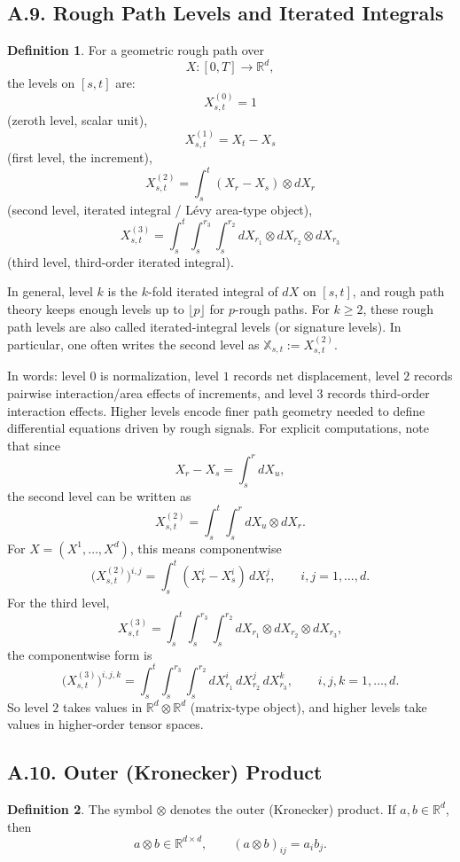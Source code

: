 \documentclass[11pt]{article}
\theoremstyle{definition}
\newtheorem{definition}{Definition}
\theoremstyle{remark}
\begin{document}
\subsection*{A.9. Rough Path Levels and Iterated Integrals}
\begin{definition}
For a geometric rough path over
\[
X:[0,T]\to\mathbb R^d,
\]
the levels on $[s,t]$ are:
\[
X_{s,t}^{(0)}=1
\]
(zeroth level, scalar unit),
\[
X_{s,t}^{(1)}=X_t-X_s
\]
(first level, the increment),
\[
X_{s,t}^{(2)}=\int_s^t (X_r-X_s)\otimes dX_r
\]
(second level, iterated integral / L\'evy area-type object),
\[
X_{s,t}^{(3)}
=
\int_s^t\int_s^{r_3}\int_s^{r_2}
dX_{r_1}\otimes dX_{r_2}\otimes dX_{r_3}
\]
(third level, third-order iterated integral).

In general, level $k$ is the $k$-fold iterated integral of $dX$ on $[s,t]$, and rough path theory keeps enough levels up to $\lfloor p\rfloor$ for $p$-rough paths.
For $k\ge2$, these rough path levels are also called iterated-integral levels (or signature levels).
In particular, one often writes the second level as $\mathbb X_{s,t}:=X_{s,t}^{(2)}$.

In words: level $0$ is normalization, level $1$ records net displacement, level $2$ records pairwise interaction/area effects of increments, and level $3$ records third-order interaction effects. Higher levels encode finer path geometry needed to define differential equations driven by rough signals.
For explicit computations, note that since
\[
X_r-X_s=\int_s^r dX_u,
\]
the second level can be written as
\[
X_{s,t}^{(2)}
=
\int_s^t\int_s^r dX_u\otimes dX_r.
\]
For $X=(X^1,\dots,X^d)$, this means componentwise
\[
\bigl(X_{s,t}^{(2)}\bigr)^{i,j}
=
\int_s^t (X_r^i-X_s^i)\,dX_r^j,
\qquad i,j=1,\dots,d.
\]
For the third level,
\[
X_{s,t}^{(3)}
=
\int_s^t\int_s^{r_3}\int_s^{r_2}
dX_{r_1}\otimes dX_{r_2}\otimes dX_{r_3},
\]
the componentwise form is
\[
\bigl(X_{s,t}^{(3)}\bigr)^{i,j,k}
=
\int_s^t\int_s^{r_3}\int_s^{r_2}
dX_{r_1}^i\,dX_{r_2}^j\,dX_{r_3}^k,
\qquad i,j,k=1,\dots,d.
\]
So level $2$ takes values in $\mathbb R^d\otimes\mathbb R^d$ (matrix-type object), and higher levels take values in higher-order tensor spaces.
\end{definition}

\subsection*{A.10. Outer (Kronecker) Product}
\begin{definition}
The symbol $\otimes$ denotes the outer (Kronecker) product. If $a,b\in\mathbb R^d$, then
\[
a\otimes b\in\mathbb R^{d\times d},
\qquad
(a\otimes b)_{ij}=a_i b_j.
\]
\end{definition}
\end{document}
